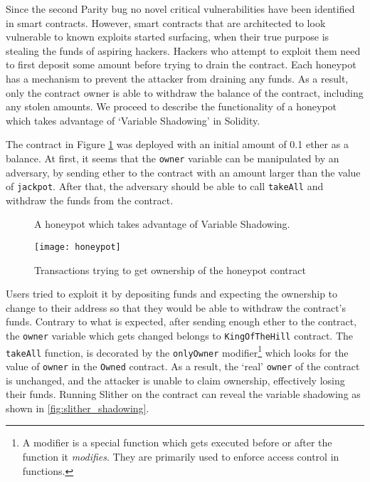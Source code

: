 

Since the second Parity bug no novel critical vulnerabilities have been identified in smart contracts. However, smart contracts that are architected to look vulnerable to known exploits started surfacing, when their true purpose is stealing the funds of aspiring hackers. %
Hackers who attempt to exploit them need to first deposit some amount before trying to drain the contract. Each honeypot has a mechanism to prevent the attacker from draining any funds. As a result, only the contract owner is able to withdraw the balance of the contract, including any stolen amounts. %
We proceed to describe the functionality of a honeypot which takes advantage of `Variable Shadowing' in Solidity. 

The contract in Figure \ref{fig:owner_honeypot} was deployed with an initial amount of 0.1 ether as a balance. At first, it seems that the \texttt{owner} variable can be manipulated by an adversary, by sending ether to the contract with an amount larger than the value of \texttt{jackpot}. After that, the adversary should be able to call \texttt{takeAll} and withdraw the funds from the contract.

\begin{figure}[ht!]
    \centering
    
    \caption{A honeypot which takes advantage of Variable Shadowing.}
    \label{fig:owner_honeypot}
\end{figure}

\begin{figure}[ht!]
    \centering
    \texttt{[image: honeypot]}
    \caption{Transactions trying to get ownership of the honeypot contract}
    \label{fig:honeypot_tx}
\end{figure}

Users tried to exploit it by depositing funds and expecting the ownership to change to their address so that they would be able to withdraw the contract's funds. Contrary to what is expected, after sending enough ether to the contract, the \texttt{owner} variable which gets changed belongs to \texttt{KingOfTheHill} contract. The \texttt{takeAll} function, is decorated by the \texttt{onlyOwner} modifier\footnote{A modifier is a special function which gets executed before or after the function it \textit{modifies}. They are primarily used to enforce access control in functions.} which looks for the value of \texttt{owner} in the \texttt{Owned} contract. As a result, the `real' \texttt{owner} of the contract is unchanged, and the attacker is unable to claim ownership, effectively losing their funds. Running Slither on the contract can reveal the variable shadowing as shown in \ref{fig:slither_shadowing}.

